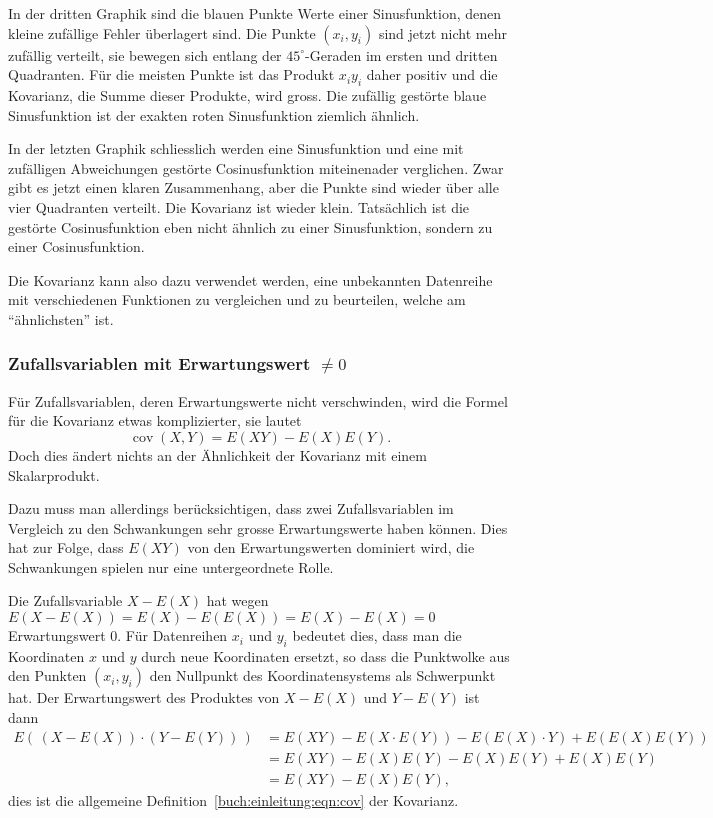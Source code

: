 In der dritten Graphik sind die blauen Punkte Werte einer
Sinusfunktion, denen kleine zufällige Fehler überlagert sind.
Die Punkte $(x_i,y_i)$ sind jetzt nicht mehr zufällig verteilt,
sie bewegen sich entlang der $45^\circ$-Geraden im ersten
und dritten Quadranten.
Für die meisten Punkte ist das Produkt $x_iy_i$ daher positiv und
die Kovarianz, die Summe dieser Produkte, wird gross.
Die zufällig gestörte blaue Sinusfunktion ist der exakten roten
Sinusfunktion ziemlich ähnlich.

In der letzten Graphik schliesslich werden eine Sinusfunktion und
%
eine mit zufälligen Abweichungen gestörte Cosinusfunktion miteinenader
verglichen.
Zwar gibt es jetzt einen klaren Zusammenhang, aber die Punkte sind
wieder über alle vier Quadranten verteilt.
Die Kovarianz ist wieder klein.
Tatsächlich ist die gestörte Cosinusfunktion eben nicht ähnlich zu 
einer Sinusfunktion, sondern zu einer Cosinusfunktion.

Die Kovarianz kann also dazu verwendet werden, eine unbekannten
Datenreihe mit verschiedenen Funktionen zu vergleichen und zu
beurteilen, welche am ``ähnlichsten'' ist.

\subsubsection{Zufallsvariablen mit Erwartungswert $\ne  0$}
Für Zufallsvariablen, deren Erwartungswerte nicht verschwinden,
wird die Formel für die Kovarianz etwas komplizierter, sie lautet
\begin{equation}
\operatorname{cov}(X,Y) = E(XY) - E(X)E(Y).
\label{buch:einleitung:eqn:cov}
\end{equation}
Doch dies ändert nichts an der Ähnlichkeit der Kovarianz 
mit einem Skalarprodukt.

Dazu muss man allerdings berücksichtigen, dass zwei Zufallsvariablen
im Vergleich zu den Schwankungen sehr grosse Erwartungswerte haben können.
Dies hat zur Folge, dass $E(XY)$ von den Erwartungswerten dominiert
wird, die Schwankungen spielen nur eine untergeordnete Rolle.

Die Zufallsvariable $X-E(X)$ hat wegen
$E(X-E(X))=E(X)-E(E(X))=E(X)-E(X)=0$ Erwartungswert $0$.
Für Datenreihen $x_i$ und $y_i$ bedeutet dies, dass man
die Koordinaten $x$ und $y$ durch neue Koordinaten ersetzt,
so dass die Punktwolke aus den Punkten $(x_i,y_i)$ den
Nullpunkt des Koordinatensystems als Schwerpunkt hat.
Der Erwartungswert des Produktes von $X-E(X)$ und $Y-E(Y)$
ist dann
\begin{align*}
E(\, (X-E(X))\cdot(Y-E(Y))\, )
&=
E(XY)-E(X\cdot E(Y)) - E(E(X)\cdot Y) + E(E(X)E(Y))
\\
&=
E(XY) - E(X)E(Y)-E(X)E(Y)+E(X)E(Y)
\\
&=
E(XY)-E(X)E(Y),
\end{align*}
dies ist die allgemeine Definition~\eqref{buch:einleitung:eqn:cov}
der Kovarianz.

